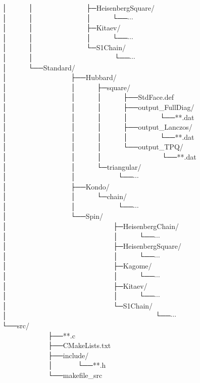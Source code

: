 │~~~~~~│~~~~~~~~~~~~~~~├─HeisenbergSquare/\\
│~~~~~~│~~~~~~~~~~~~~~~│~~~~~~└──$\cdots$\\
│~~~~~~│~~~~~~~~~~~~~~~├─Kitaev/\\
│~~~~~~│~~~~~~~~~~~~~~~│~~~~~~└──$\cdots$\\
│~~~~~~│~~~~~~~~~~~~~~~└─S1Chain/\\
│~~~~~~│~~~~~~~~~~~~~~~~~~~~~~~└──$\cdots$\\
│~~~~~~└──Standard/\\
│~~~~~~~~~~~~~~~~~~├──Hubbard/\\
│~~~~~~~~~~~~~~~~~~│~~~~~~├─square/\\
│~~~~~~~~~~~~~~~~~~│~~~~~~│~~~~~~├──StdFace.def\\
│~~~~~~~~~~~~~~~~~~│~~~~~~│~~~~~~├──output\_FullDiag/\\
│~~~~~~~~~~~~~~~~~~│~~~~~~│~~~~~~│~~~~~~~~~└──**.dat\\
│~~~~~~~~~~~~~~~~~~│~~~~~~│~~~~~~├──output\_Lanczos/\\
│~~~~~~~~~~~~~~~~~~│~~~~~~│~~~~~~│~~~~~~~~~└──**.dat\\
│~~~~~~~~~~~~~~~~~~│~~~~~~│~~~~~~└──output\_TPQ/\\
│~~~~~~~~~~~~~~~~~~│~~~~~~│~~~~~~~~~~~~~~~~~└──**.dat\\
│~~~~~~~~~~~~~~~~~~│~~~~~~└─triangular/\\
│~~~~~~~~~~~~~~~~~~│~~~~~~~~~~~~└──$\cdots$\\
│~~~~~~~~~~~~~~~~~~├──Kondo/\\
│~~~~~~~~~~~~~~~~~~│~~~~~~└─chain/\\
│~~~~~~~~~~~~~~~~~~│~~~~~~~~~~~~└──$\cdots$\\
│~~~~~~~~~~~~~~~~~~└──Spin/\\
│~~~~~~~~~~~~~~~~~~~~~~~~~~~~~~├─HeisenbergChain/\\
│~~~~~~~~~~~~~~~~~~~~~~~~~~~~~~│~~~~~~└──$\cdots$\\
│~~~~~~~~~~~~~~~~~~~~~~~~~~~~~~├─HeisenbergSquare/\\
│~~~~~~~~~~~~~~~~~~~~~~~~~~~~~~│~~~~~~└──$\cdots$\\
│~~~~~~~~~~~~~~~~~~~~~~~~~~~~~~├─Kagome/\\
│~~~~~~~~~~~~~~~~~~~~~~~~~~~~~~│~~~~~~└──$\cdots$\\
│~~~~~~~~~~~~~~~~~~~~~~~~~~~~~~├─Kitaev/\\
│~~~~~~~~~~~~~~~~~~~~~~~~~~~~~~│~~~~~~└──$\cdots$\\
│~~~~~~~~~~~~~~~~~~~~~~~~~~~~~~└─S1Chain/\\
│~~~~~~~~~~~~~~~~~~~~~~~~~~~~~~~~~~~~~~~~~~└──$\cdots$\\
└──src/\\
~~~~~~~~~~~~~├──**.c\\
~~~~~~~~~~~~~├──CMakeLists.txt\\
~~~~~~~~~~~~~├──include/\\
~~~~~~~~~~~~~│~~~~~~~└──**.h\\
~~~~~~~~~~~~~└──makefile\_src\\

